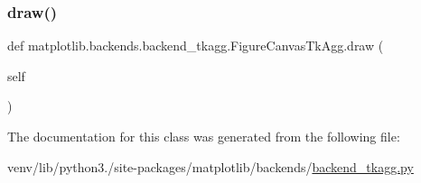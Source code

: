 \subsubsection{\texorpdfstring{draw()}{draw()}}
{\footnotesize\ttfamily def matplotlib.\+backends.\+backend\+\_\+tkagg.\+Figure\+Canvas\+Tk\+Agg.\+draw (\begin{DoxyParamCaption}\item[{}]{self }\end{DoxyParamCaption})}



The documentation for this class was generated from the following file\+:\begin{DoxyCompactItemize}
\item 
venv/lib/python3./site-\/packages/matplotlib/backends/\hyperlink{backend__tkagg_8py}{backend\+\_\+tkagg.\+py}\end{DoxyCompactItemize}
